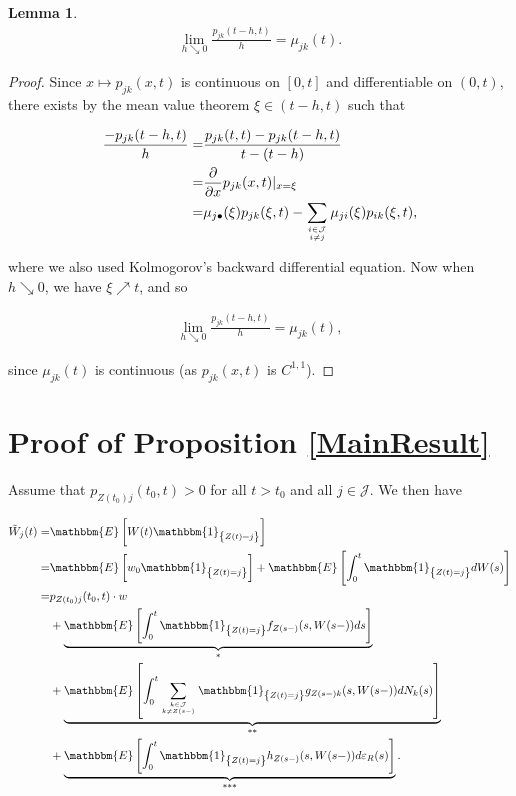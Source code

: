 \documentclass{article}
\newcommand{\1}[1]{\mathbbm{1}_{\left\lbrace #1 \right\rbrace}}
\newcommand{\expec}[1][def]{\mathbbm{E} \left[ #1 \right]}
\theoremstyle{break}
\newtheorem{lemma}[definition]{Lemma}
\theoremstyle{remark}
\numberwithin{equation}{section}
\begin{document}
\begin{appendices}
\begin{lemma}
	\begin{align*}
		\lim_{h \searrow 0} \frac{p_{jk}(t-h,t)}{h} = \mu_{jk}(t).
	\end{align*}
\end{lemma}
\begin{proof}
	Since $x \mapsto p_{jk}(x,t)$ is continuous on $[0,t]$ and differentiable on $(0,t)$, there exists by the mean value theorem $\xi \in ( t-h, t)$ such that
	
	\begin{align*}
		\frac{-p_{jk}(t-h,t)}{h} =& \frac{p_{jk}(t,t)-p_{jk}(t-h,t)}{t-(t-h)} \\
		=& \frac{\partial}{\partial x} p_{jk}(x,t)|_{x=\xi} \\
		=& \mu_{j \bullet}(\xi) p_{jk}(\xi,t) - \sum_{i \in \mathcal{J} \atop i \neq j} \mu_{ji}(\xi) p_{ik}(\xi,t),
	\end{align*}
	
	where we also used Kolmogorov's backward differential equation. Now when $h \searrow 0$, we have $\xi \nearrow t$, and so
	
	\begin{align*}
		\lim_{h \searrow 0} \frac{p_{jk}(t-h,t)}{h} = \mu_{jk}(t),
	\end{align*}
	
	since $\mu_{jk}(t)$ is continuous (as $p_{jk}(x,t)$ is $C^{1,1}$).
\end{proof}

\newpage

\section{Proof of Proposition \ref{MainResult}} \label{MainProof}

Assume that $p_{Z(t_0)j}(t_0,t)>0$ for all $t>t_0$ and all $j \in \mathcal{J}$. We then have

\begin{align*}
    \tilde{W}_j(t) =& \expec[W(t) \1{Z(t)=j}] \\
    =& \expec[w_0 \1{Z(t)=j}] + \expec[\int_0^t \1{Z(t)=j} dW(s)] \\
    =& p_{Z(t_0)j}(t_0,t) \cdot w \\
    &+ \underbrace{\expec[\int_0^t \1{Z(t)=j} f_{Z(s-)}(s,W(s-)) ds]}_* \\
    &+ \underbrace{\expec[\int_0^t \sum_{k \in \mathcal{J} \atop k \neq Z(s-)} \1{Z(t)=j} g_{Z(s-)k}(s,W(s-)) dN_k(s)]}_{**} \\
    &+ \underbrace{\expec[\int_0^t \1{Z(t)=j} h_{Z(s-)}(s,W(s-)) d \varepsilon_{R}(s)]}_{***}.
\end{align*}


\end{appendices}
\end{document}
